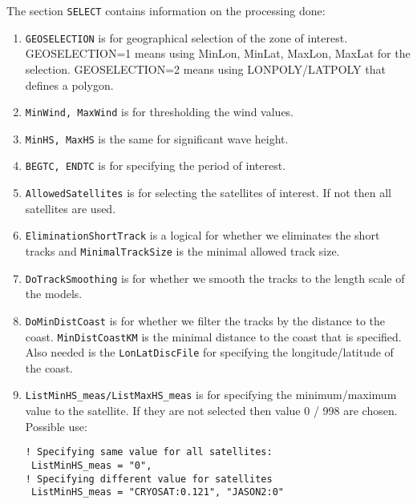 \documentclass[12pt]{amsart}
\begin{document}
The section {\tt SELECT} contains information on the processing done:
\begin{enumerate}
\item {\tt GEOSELECTION} is for geographical selection of the zone of interest. GEOSELECTION=1 means using MinLon, MinLat, MaxLon, MaxLat for the selection. GEOSELECTION=2 means using LONPOLY/LATPOLY that defines a polygon.
\item {\tt MinWind, MaxWind} is for thresholding the wind values.
\item {\tt MinHS, MaxHS} is the same for significant wave height.
\item {\tt BEGTC, ENDTC} is for specifying the period of interest.
\item {\tt AllowedSatellites} is for selecting the satellites of interest. If not then all satellites are used.
\item {\tt EliminationShortTrack} is a logical for whether we eliminates the short tracks and {\tt MinimalTrackSize} is the minimal allowed track size.
\item {\tt DoTrackSmoothing} is for whether we smooth the tracks to the length scale of the models.
\item {\tt DoMinDistCoast} is for whether we filter the tracks by the distance to the coast. {\tt MinDistCoastKM} is the minimal distance to the coast that is specified. Also needed is the {\tt LonLatDiscFile} for specifying the longitude/latitude of the coast.
\item {\tt ListMinHS\_meas/ListMaxHS\_meas} is for specifying the minimum/maximum value to the satellite. If they are not selected then value 0 / 998 are chosen. Possible use:
\begin{verbatim}
! Specifying same value for all satellites:
 ListMinHS_meas = "0",
! Specifying different value for satellites
 ListMinHS_meas = "CRYOSAT:0.121", "JASON2:0"
\end{verbatim}
  
\end{enumerate}
\end{document}
